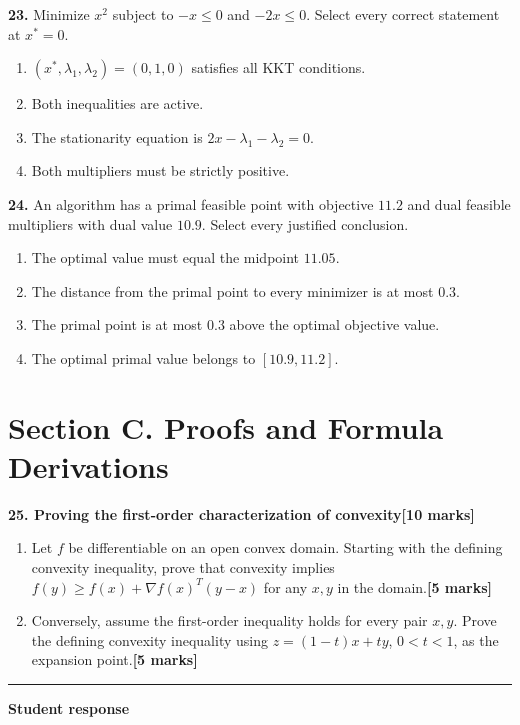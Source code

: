 \documentclass[11pt,a4paper]{article}
\begin{document}
\par\noindent\begin{minipage}{\linewidth}
\textbf{23.} Minimize \(x^2\) subject to \(-x\le0\) and \(-2x\le0\). Select every correct statement at \(x^*=0\).
\begin{enumerate}[label=(\Alph*),leftmargin=8mm,itemsep=2pt,topsep=2pt]
\item \((x^*,\lambda_1,\lambda_2)=(0,1,0)\) satisfies all KKT conditions.
\item Both inequalities are active.
\item The stationarity equation is \(2x-\lambda_1-\lambda_2=0\).
\item Both multipliers must be strictly positive.
\end{enumerate}

\end{minipage}\par\vspace{3mm}
\par\noindent\begin{minipage}{\linewidth}
\textbf{24.} An algorithm has a primal feasible point with objective \(11.2\) and dual feasible multipliers with dual value \(10.9\). Select every justified conclusion.
\begin{enumerate}[label=(\Alph*),leftmargin=8mm,itemsep=2pt,topsep=2pt]
\item The optimal value must equal the midpoint \(11.05\).
\item The distance from the primal point to every minimizer is at most \(0.3\).
\item The primal point is at most \(0.3\) above the optimal objective value.
\item The optimal primal value belongs to \([10.9,11.2]\).
\end{enumerate}

\end{minipage}\par\vspace{3mm}
\newpage\section*{Section C. Proofs and Formula Derivations}
\textbf{25. Proving the first-order characterization of convexity}\hfill\textbf{[10 marks]}\par\medskip
\begin{enumerate}[label=(\alph*),leftmargin=8mm,itemsep=3pt]
\item Let \(f\) be differentiable on an open convex domain. Starting with the defining convexity inequality, prove that convexity implies \(f(y)\ge f(x)+\nabla f(x)^T(y-x)\) for any \(x,y\) in the domain.\hfill\textbf{[5 marks]}
\item Conversely, assume the first-order inequality holds for every pair \(x,y\). Prove the defining convexity inequality using \(z=(1-t)x+ty\), \(0<t<1\), as the expansion point.\hfill\textbf{[5 marks]}
\end{enumerate}\par\medskip\hrule\medskip\textbf{Student response}\par
\end{document}
